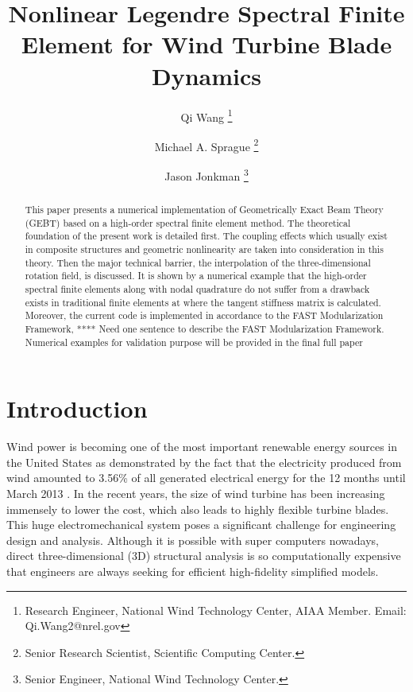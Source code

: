\documentclass{aiaa-tc}
\title{Nonlinear Legendre Spectral Finite Element for Wind Turbine Blade Dynamics}
\author[1]{Qi Wang  \thanks{Research Engineer, National Wind Technology Center, AIAA Member. Email: Qi.Wang2@nrel.gov}}
\author[1]{Michael A. Sprague \thanks{Senior Research Scientist, Scientific Computing Center.}}
\author[1]{Jason Jonkman \thanks{Senior Engineer, National Wind Technology Center.}}
\affil[1]{National Renewable Energy Laboratory, Golden, CO 80401-3305}
\renewcommand{\kill}[1]{\textcolor{red}{\sout{#1}}}
\begin{document}
\maketitle

\begin{abstract}
{ This paper presents a numerical implementation of Geometrically Exact Beam Theory (GEBT) based on a high-order spectral finite element method. The theoretical foundation of the present work is detailed first. The coupling effects which usually exist in composite structures  and geometric nonlinearity are taken into consideration in this theory. Then the major technical barrier, the interpolation of the three-dimensional rotation field, is discussed. It is shown by a numerical example that the high-order spectral finite elements along with nodal quadrature do not suffer from a drawback exists in traditional finite elements at where the tangent stiffness matrix is calculated. Moreover, the current code is implemented in accordance to the FAST Modularization Framework, **** {\color{red}  Need one sentence to describe the FAST Modularization Framework}. Numerical examples for validation purpose will be provided in the final full paper}     
\end{abstract}



\section{Introduction}
Wind power is becoming one of the most important renewable energy sources in the United States as demonstrated by the fact that the electricity produced from wind amounted to 3.56\% of all generated electrical energy for the 12 months until March 2013 \cite{WindWiki}. In the recent years, the size of wind turbine has been increasing immensely to lower the cost, which also leads to highly flexible turbine blades. This huge electromechanical system poses a significant challenge for engineering design and analysis. Although it is possible with super computers nowadays, direct three-dimensional (3D) structural analysis is so computationally expensive that engineers are always seeking for efficient high-fidelity simplified models.
\end{document}
